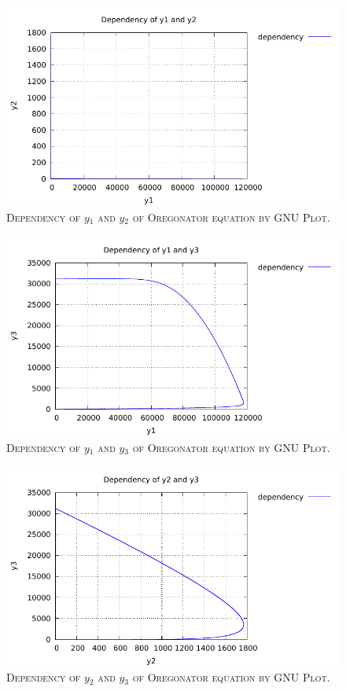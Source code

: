 \documentclass[a4paper,oneside]{book}
\numberwithin{equation}{chapter}
\begin{document}
\begin{figure}[H]
\centering
\includegraphics[scale=1.1]{o_d_1_2}
\caption{\textsc{Dependency of $y_1$ and $y_2$ of Oregonator equation by GNU Plot.}}
\end{figure}
\begin{figure}[H]
\centering
\includegraphics[scale=1.1]{o_d_1_3}
\caption{\textsc{Dependency of $y_1$ and $y_3$ of Oregonator equation by GNU Plot.}}
\end{figure}
\begin{figure}[H]
\centering
\includegraphics[scale=1.1]{o_d_2_3}
\caption{\textsc{Dependency of $y_2$ and $y_3$ of Oregonator equation by GNU Plot.}}
\end{figure}
\end{document}
